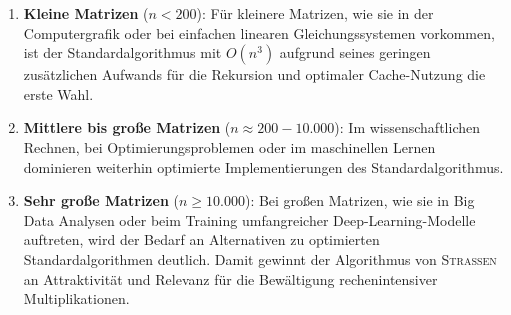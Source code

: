 \documentclass{scrartcl}
\begin{document}
\begin{enumerate}
	\item \textbf{Kleine Matrizen} ($n < 200$): Für kleinere Matrizen, wie sie in der Computergrafik oder bei einfachen linearen Gleichungssystemen vorkommen, ist der Standardalgorithmus mit $O(n^3)$ aufgrund seines geringen zusätzlichen Aufwands für die Rekursion und optimaler Cache-Nutzung die erste Wahl.
		
	\item \textbf{Mittlere bis große Matrizen} ($n \approx 200 - 10.000$): Im wissenschaftlichen Rechnen, bei Optimierungsproblemen oder im maschinellen Lernen dominieren weiterhin optimierte Implementierungen des Standardalgorithmus.
	
	\item \textbf{Sehr große Matrizen} ($n \ge 10.000$): Bei großen Matrizen, wie sie in Big Data Analysen oder beim Training umfangreicher Deep-Learning-Modelle auftreten, wird der Bedarf an Alternativen zu optimierten Standardalgorithmen deutlich. Damit gewinnt der Algorithmus von \textsc{Strassen} an Attraktivität und Relevanz für die Bewältigung rechenintensiver Multiplikationen.
\end{enumerate}
\end{document}
